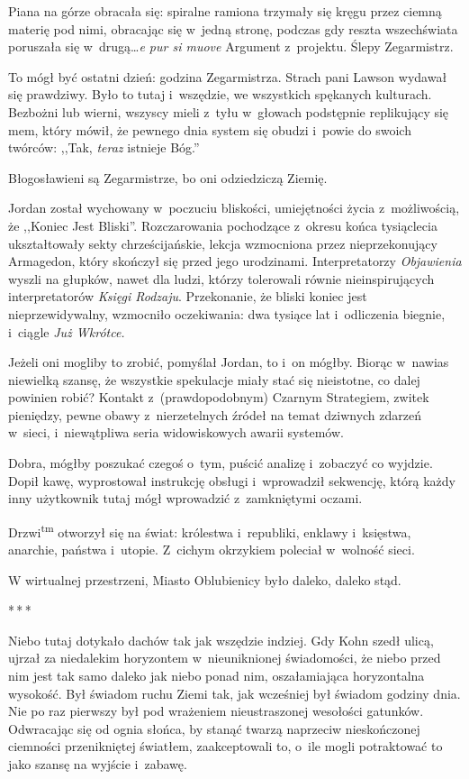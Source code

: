 \documentclass[oneside,polish,11pt,sfheadings]{mwbk}
\newcommand{\threeast}{\bigskip\par\centerline{*\,*\,*}\medskip\par}%
\begin{document}
Piana na górze obracała się: spiralne ramiona trzymały się kręgu przez
ciemną materię pod nimi, obracając się w~jedną stronę, podczas gdy
reszta wszechświata poruszała się w~drugą\ldots \emph{e pur si muove}
Argument z~projektu. Ślepy Zegarmistrz.

To mógł być ostatni dzień: godzina Zegarmistrza. Strach pani Lawson
wydawał się prawdziwy. Było to tutaj i~wszędzie, we wszystkich spękanych
kulturach. Bezbożni lub wierni, wszyscy mieli z~tyłu w~głowach
podstępnie replikujący się mem, który mówił, że pewnego dnia system się
obudzi i~powie do swoich twórców: ,,Tak, \emph{teraz }istnieje Bóg.''

Błogosławieni są Zegarmistrze, bo oni odziedziczą Ziemię.

Jordan został wychowany w~poczuciu bliskości, umiejętności życia z~możliwością, że ,,Koniec Jest Bliski''. Rozczarowania pochodzące z~okresu
końca tysiąclecia ukształtowały sekty chrześcijańskie, lekcja wzmocniona
przez nieprzekonujący Armagedon, który skończył się przed jego
urodzinami. Interpretatorzy \emph{Objawienia} wyszli na głupków, nawet
dla ludzi, którzy tolerowali równie nieinspirujących interpretatorów
\emph{Księgi Rodzaju}. Przekonanie, że bliski koniec jest
nieprzewidywalny, wzmocniło oczekiwania: dwa tysiące lat i~odliczenia
biegnie, i~ciągle \emph{Już Wkrótce.}

Jeżeli oni mogliby to zrobić, pomyślał Jordan, to i~on mógłby. Biorąc w~nawias niewielką szansę, że wszystkie spekulacje miały stać się
nieistotne, co dalej powinien robić? Kontakt z~(prawdopodobnym) Czarnym
Strategiem, zwitek pieniędzy, pewne obawy z~nierzetelnych źródeł na
temat dziwnych zdarzeń w~sieci, i~niewątpliwa seria widowiskowych awarii
systemów.

Dobra, mógłby poszukać czegoś o~tym, puścić analizę i~zobaczyć co
wyjdzie. Dopił kawę, wyprostował instrukcję obsługi i~wprowadził
sekwencję, którą każdy inny użytkownik tutaj mógł wprowadzić z~zamkniętymi oczami.

Drzwi\textsuperscript{tm} otworzył się na świat: królestwa i~republiki,
enklawy i~księstwa, anarchie, państwa i~utopie. Z~cichym okrzykiem
poleciał w~wolność sieci.

W wirtualnej przestrzeni, Miasto Oblubienicy było daleko, daleko stąd.

\threeast

Niebo tutaj dotykało dachów tak jak wszędzie indziej. Gdy Kohn szedł
ulicą, ujrzał za niedalekim horyzontem w~nieuniknionej świadomości, że
niebo przed nim jest tak samo daleko jak niebo ponad nim, oszałamiająca
horyzontalna wysokość. Był świadom ruchu Ziemi tak, jak wcześniej był
świadom godziny dnia. Nie po raz pierwszy był pod wrażeniem
nieustraszonej wesołości gatunków. Odwracając się od ognia słońca, by
stanąć twarzą naprzeciw nieskończonej ciemności przenikniętej światłem,
zaakceptowali to, o~ile mogli potraktować to jako szansę na wyjście i~zabawę.
\end{document}
